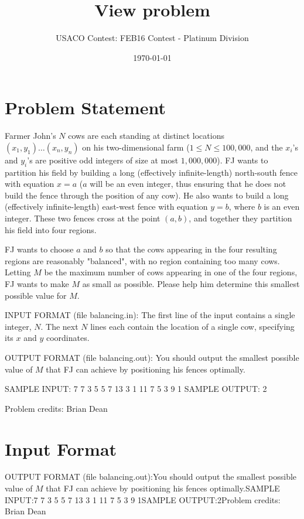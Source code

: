 \documentclass[12pt]{article}
\title{View problem}
\author{USACO Contest: FEB16 Contest - Platinum Division}
\date{\today}
\begin{document}
\maketitle

\section*{Problem Statement}

Farmer John's $N$ cows are each standing at distinct locations
$(x_1, y_1) \ldots (x_n, y_n)$ on his two-dimensional farm
($1 \leq N \leq 100,000$, and the $x_i$'s and $y_i$'s are positive odd integers
of size at most $1,000,000$).  FJ wants to partition his field by building a 
long (effectively infinite-length) north-south fence with equation $x=a$ ($a$
will be an even integer, thus ensuring that he does not build the fence through
the position of any cow). He also wants to build a long (effectively
infinite-length) east-west fence with equation $y=b$, where $b$ is an even
integer.  These two fences cross at the point $(a,b)$, and together they
partition his field into four regions.  

FJ wants to choose $a$ and $b$ so that the cows appearing in the four resulting
regions are reasonably "balanced", with no region containing too many cows. 
Letting $M$ be the maximum number of cows appearing in one of the four regions,
FJ wants to make $M$ as small as possible.  Please help him determine this
smallest possible value for $M$.

INPUT FORMAT (file balancing.in):
The first line of the input contains a single integer, $N$. The next $N$ lines
each contain the location of a single cow, specifying its $x$ and $y$
coordinates.

OUTPUT FORMAT (file balancing.out):
You should output the smallest possible value of $M$ that FJ can achieve by
positioning his fences optimally.

SAMPLE INPUT:
7
7 3
5 5
7 13
3 1
11 7
5 3
9 1
SAMPLE OUTPUT: 
2

Problem credits: Brian Dean



\section*{Input Format}
OUTPUT FORMAT (file balancing.out):You should output the smallest possible value of $M$ that FJ can achieve by
positioning his fences optimally.SAMPLE INPUT:7
7 3
5 5
7 13
3 1
11 7
5 3
9 1SAMPLE OUTPUT:2Problem credits: Brian Dean
\end{document}
